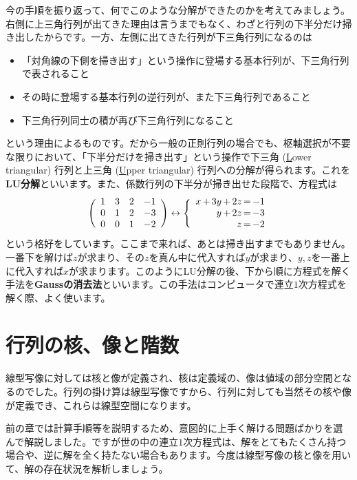 今の手順を振り返って、何でこのような分解ができたのかを考えてみましょう。右側に上三角行列が出てきた理由は言うまでもなく、わざと行列の下半分だけ掃き出したからです。一方、左側に出てきた行列が下三角行列になるのは
\begin{itemize}
\item 「対角線の下側を掃き出す」という操作に登場する基本行列が、下三角行列で表されること
\item その時に登場する基本行列の逆行列が、また下三角行列であること
\item 下三角行列同士の積が再び下三角行列になること
\end{itemize}
という理由によるものです。だから一般の正則行列の場合でも、枢軸選択が不要な限りにおいて、「下半分だけを掃き出す」という操作で下三角 (\underline{L}ower triangular) 行列と上三角 (\underline{U}pper triangular) 行列への分解が得られます。これを\textbf{LU分解}といいます。また、係数行列の下半分が掃き出せた段階で、方程式は
\begin{align*}
\Biggl(
\begin{array}{rrrr}
1 & 3 & 2 & -1 \\
0 & 1 & 2 & -3 \\
0 & 0 & 1 & -2
\end{array}
\Biggr)
\leftrightarrow
\Biggl\{
\begin{array}{r@{\,}r@{\,}r@{\,}r@{\,}r@{\,}r@{\,}r}
x & + & 3y & + & 2z & = & -1 \\
& & y & + & 2z & = & -3 \\
& & & & z & = & -2
\end{array}
\end{align*}
という格好をしています。ここまで来れば、あとは掃き出すまでもありません。一番下を解けば$z$が求まり、その$z$を真ん中に代入すれば$y$が求まり、$y, z$を一番上に代入すれば$x$が求まります。このようにLU分解の後、下から順に方程式を解く手法を\textbf{Gaussの消去法}といいます。この手法はコンピュータで連立$1$次方程式を解く際、よく使います。

\section{行列の核、像と階数}

線型写像に対しては核と像が定義され、核は定義域の、像は値域の部分空間となるのでした。行列の掛け算は線型写像ですから、行列に対しても当然その核や像が定義でき、これらは線型空間になります。

前の章では計算手順等を説明するため、意図的に上手く解ける問題ばかりを選んで解説しました。ですが世の中の連立$1$次方程式は、解をとてもたくさん持つ場合や、逆に解を全く持たない場合もあります。今度は線型写像の核と像を用いて、解の存在状況を解析しましょう。

